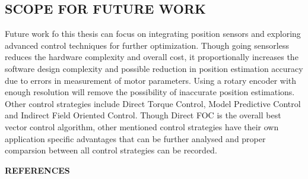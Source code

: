 \subsection{SCOPE FOR FUTURE WORK}

Future work fo this thesis can focus on integrating position sensors and exploring advanced control techniques for further optimization. Though going sensorless reduces the hardware complexity and overall cost, it proportionally increases the software design complexity and possible reduction in position estimation accuracy due to errors in measurement of motor parameters. Using a rotary encoder with enough resolution will remove the possibility of inaccurate position estimations. Other control strategies include Direct Torque Control, Model Predictive Control and Indirect Field Oriented Control. Though Direct FOC is the overall best vector control algorithm, other mentioned control strategies have their own application specific advantages that can be further analysed and proper comparsion between all control strategies can be recorded.


\newpage


\begin{center}
      {\textbf{REFERENCES}}
\end{center}

